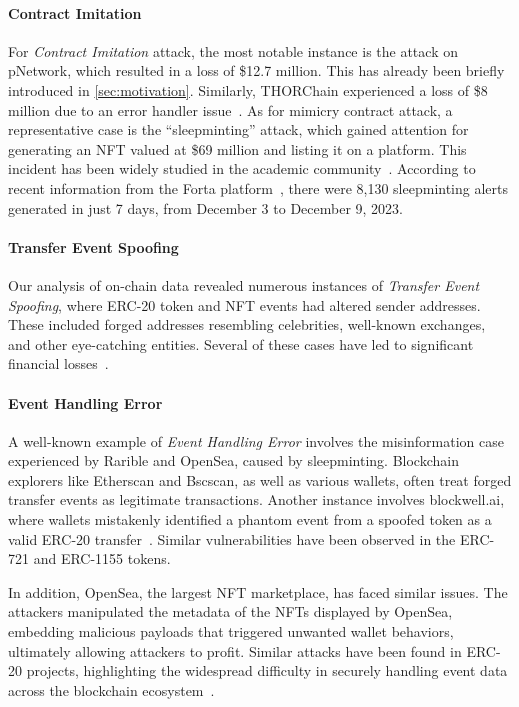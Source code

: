 \paragraph{Contract Imitation}
For \emph{Contract Imitation} attack, the most notable instance is the attack on pNetwork, which resulted in a loss of \$12.7 million. This has already been briefly introduced in \cref{sec:motivation}. Similarly, THORChain experienced a loss of \$8 million due to an error handler issue~\cite{thorchain}. As for mimicry contract attack, a representative case is the ``sleepminting'' attack, which gained attention for generating an NFT valued at \$69 million and listing it on a platform. This incident has been widely studied in the academic community~\cite{nft_sleepminting,clone_nft,sleepminting}. According to recent information from the Forta platform~\cite{sleepminting_forta}, there were 8,130 sleepminting alerts generated in just 7 days, from December 3 to December 9, 2023.

\paragraph{Transfer Event Spoofing}
Our analysis of on-chain data revealed numerous instances of \emph{Transfer Event Spoofing}, where ERC-20 token and NFT events had altered sender addresses. These included forged addresses resembling celebrities, well-known exchanges, and other eye-catching entities. Several of these cases have led to significant financial losses~\cite{layerzero_scam,TetherClaims,ethaddress,zero_transfer,wallet_visual}.

\paragraph{Event Handling Error}
A well-known example of \emph{Event Handling Error} involves the misinformation case experienced by Rarible and OpenSea, caused by sleepminting. Blockchain explorers like Etherscan and Bscscan, as well as various wallets, often treat forged transfer events as legitimate transactions. Another instance involves blockwell.ai, where wallets mistakenly identified a phantom event from a spoofed token as a valid ERC-20 transfer~\cite{blockwell.ai}. Similar vulnerabilities have been observed in the ERC-721 and ERC-1155 tokens.

In addition, OpenSea, the largest NFT marketplace, has faced similar issues. The attackers manipulated the metadata of the NFTs displayed by OpenSea, embedding malicious payloads that triggered unwanted wallet behaviors, ultimately allowing attackers to profit. Similar attacks have been found in ERC-20 projects, highlighting the widespread difficulty in securely handling event data across the blockchain ecosystem~\cite{rektosaurus,OpenSea}.

